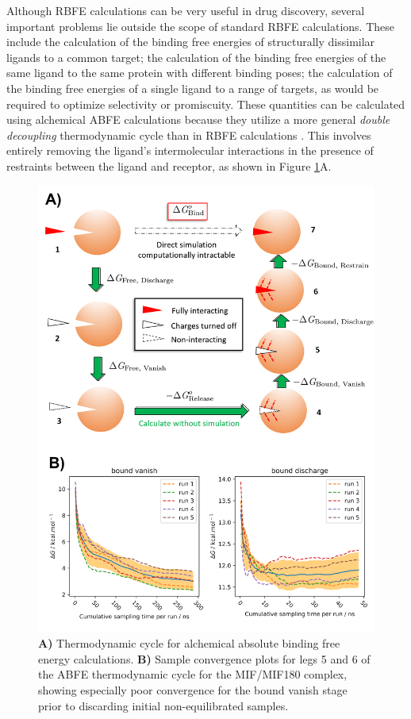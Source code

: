 Although RBFE calculations can be very useful in drug discovery, several important problems lie outside the scope of standard RBFE calculations. These include the calculation of the binding free energies of structurally dissimilar ligands to a common target; the calculation of the binding free energies of the same ligand to the same protein with different binding poses; the calculation of the binding free energies of a single ligand to a range of targets, as would be required to optimize selectivity or promiscuity. These quantities can be calculated using alchemical ABFE calculations because they utilize a more general \emph{double decoupling} thermodynamic cycle than in RBFE calculations \cite{gilson_statistical-thermodynamic_1997}. This involves entirely removing the ligand's intermolecular interactions in the presence of restraints between the ligand and receptor, as shown in Figure \ref{abfe_fig}A. 

\begin{figure}[htp]
\includegraphics[width=\linewidth]{LIVECOMS/04_fep/abfe-tutorial.png}
\caption{ \textbf{A)} Thermodynamic cycle for alchemical absolute binding free energy calculations. \textbf{B)} Sample convergence plots for legs 5 and 6 of the ABFE thermodynamic cycle for the MIF/MIF180 complex, showing especially poor convergence for the bound vanish stage prior to discarding initial non-equilibrated samples.} 
\label{abfe_fig}
\end{figure}

